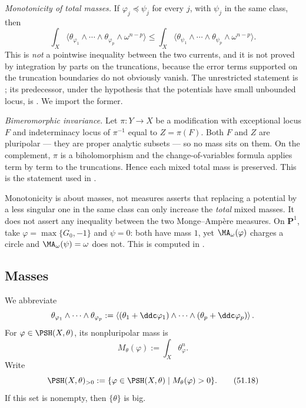\emph{Monotonicity of total masses.}  If
\(\varphi_j\preceq\psi_j\) for every \(j\), with \(\psi_j\) in the same
class, then
\[
 \int_X\langle\theta_{\varphi_1}\wedge\cdots\wedge\theta_{\varphi_p}
 \wedge\omega^{n-p}\rangle
 \leq
 \int_X\langle\theta_{\psi_1}\wedge\cdots\wedge\theta_{\psi_p}
 \wedge\omega^{n-p}\rangle .
\]
This is \emph{not} a pointwise inequality between the two currents, and it
is not proved by integration by parts on the truncations, because the
error terms supported on the truncation boundaries do not obviously
vanish.  The unrestricted statement is
\cite[Theorem~1.1]{DDNL18mono}; its predecessor, under the hypothesis that
the potentials have small unbounded locus, is
\cite[Theorem~1.16]{BEGZ10}.  We import the former.

\emph{Bimeromorphic invariance.}  Let \(\pi:Y\to X\) be a modification
with exceptional locus \(F\) and indeterminacy locus of \(\pi^{-1}\)
equal to \(Z=\pi(F)\).  Both \(F\) and \(Z\) are pluripolar --- they are
proper analytic subsets --- so no mass sits on them.  On the complement,
\(\pi\) is a biholomorphism and the change-of-variables formula applies
term by term to the truncations.  Hence each mixed total mass is
preserved.  This is the statement used in
.

\begin{warning}{Monotonicity is about masses, not measures}
\label{warn:ch51-monotonicity}
 asserts that replacing a potential by a
less singular one in the same class can only increase the \emph{total}
mixed masses.  It does not assert any inequality between the two
Monge--Amp\`ere measures.  On \(\mathbf P^1\), take \(\varphi=\max\{G_0,
-1\}\) and \(\psi=0\): both have mass \(1\), yet
\(\MA_\omega(\varphi)\) charges a circle and \(\MA_\omega(\psi)=\omega\)
does not.  This is computed in .
\end{warning}

\subsection{Masses}
\label{sec:ch51-masses}

We abbreviate
\[
 \theta_{\varphi_1}\wedge\cdots\wedge\theta_{\varphi_p}
 :=\left\langle
   (\theta_1+\ddc\varphi_1)\wedge\cdots\wedge
   (\theta_p+\ddc\varphi_p)\right\rangle .
\]
For \(\varphi\in\PSH(X,\theta)\), its nonpluripolar mass is
\[
                         M_\theta(\varphi)
 :=\int_X\theta_\varphi^n.
\tag{51.17}\label{eq:complex-npp-mass}
\]
Write
\[
 \PSH(X,\theta)_{>0}
 :=\{\varphi\in\PSH(X,\theta)\mid M_\theta(\varphi)>0\}.
\tag{51.18}\label{eq:complex-positive-mass}
\]
If this set is nonempty, then \(\{\theta\}\) is big.


